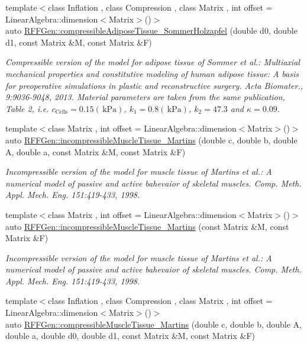 \begin{DoxyCompactItemize}
{\footnotesize template$<$class Inflation , class Compression , class Matrix , int offset = Linear\-Algebra\-::dimension$<$\-Matrix$>$()$>$ }\\auto \hyperlink{group__Biomechanics_ga3f3e0d2799629dab092114d59233bc03}{R\-F\-F\-Gen\-::compressible\-Adipose\-Tissue\-\_\-\-Sommer\-Holzapfel} (double d0, double d1, const Matrix \&M, const Matrix \&F)
\begin{DoxyCompactList}\small\item\em Compressible version of the model for adipose tissue of Sommer et al.\-: Multiaxial mechanical properties and constitutive modeling of human adipose tissue\-: A basis for preoperative simulations in plastic and reconstructive surgery. Acta Biomater., 9\-:9036-\/9048, 2013. Material parameters are taken from the same publication, Table 2, i.\-e. $c_\mathrm{Cells}=0.15 (\,\mathrm{kPa})$, $k_1=0.8 (\,\mathrm{kPa})$, $k_2=47.3$ and $\kappa=0.09$. \end{DoxyCompactList}\item 
{\footnotesize template$<$class Matrix , int offset = Linear\-Algebra\-::dimension$<$\-Matrix$>$()$>$ }\\auto \hyperlink{group__Biomechanics_ga6c85de42ee96ce8b8505dd22d2327e12}{R\-F\-F\-Gen\-::incompressible\-Muscle\-Tissue\-\_\-\-Martins} (double c, double b, double A, double a, const Matrix \&M, const Matrix \&F)
\begin{DoxyCompactList}\small\item\em Incompressible version of the model for muscle tissue of Martins et al.\-: A numerical model of passive and active bahevaior of skeletal muscles. Comp. Meth. Appl. Mech. Eng. 151\-:419-\/433, 1998. \end{DoxyCompactList}\item 
{\footnotesize template$<$class Matrix , int offset = Linear\-Algebra\-::dimension$<$\-Matrix$>$()$>$ }\\auto \hyperlink{group__Biomechanics_ga79c7b90af1f57945e9c1c8e547d6e9ee}{R\-F\-F\-Gen\-::incompressible\-Muscle\-Tissue\-\_\-\-Martins} (const Matrix \&M, const Matrix \&F)
\begin{DoxyCompactList}\small\item\em Incompressible version of the model for muscle tissue of Martins et al.\-: A numerical model of passive and active bahevaior of skeletal muscles. Comp. Meth. Appl. Mech. Eng. 151\-:419-\/433, 1998. \end{DoxyCompactList}\item 
{\footnotesize template$<$class Inflation , class Compression , class Matrix , int offset = Linear\-Algebra\-::dimension$<$\-Matrix$>$()$>$ }\\auto \hyperlink{group__Biomechanics_gaaa21bcb424d6ea5a591e454bcfa9cec1}{R\-F\-F\-Gen\-::compressible\-Muscle\-Tissue\-\_\-\-Martins} (double c, double b, double A, double a, double d0, double d1, const Matrix \&M, const Matrix \&F)

\end{DoxyCompactItemize}
